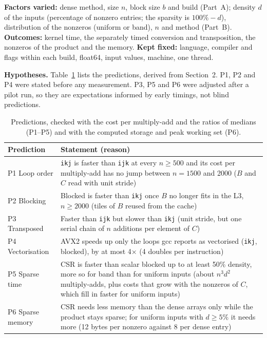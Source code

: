 \documentclass[11pt,a4paper]{article}
\begin{document}
\textbf{Factors varied:} dense method, size $n$, block size $b$ and build (Part~A); density
$d$ of the inputs (percentage of nonzero entries; the sparsity is $100\% - d$), distribution
of the nonzeros (uniform or band), $n$ and method (Part~B). \textbf{Outcomes:} kernel time,
the separately timed conversion and transposition, the nonzeros of the product and the
memory. \textbf{Kept fixed:} language, compiler and flags within each build, float64, input
values, machine, one thread.

\needspace{0.35\textheight}
\textbf{Hypotheses.} Table~\ref{tab:predictions} lists the predictions, derived from
Section~2. P1, P2 and P4 were stated before any measurement. P3, P5 and P6 were adjusted
after a pilot run, so they are expectations informed by early timings, not blind
predictions.

\begin{table}[H]
\centering
\small
\setlength{\tabcolsep}{4pt}
\begin{tabular}{>{\raggedright\arraybackslash}p{2.7cm}p{12.5cm}}
\toprule
\textbf{Prediction} & \textbf{Statement (reason)} \\
\midrule
P1 Loop order & \texttt{ikj} is faster than \texttt{ijk} at every $n \ge 500$ and its cost
per multiply-add has no jump between $n = 1500$ and 2000 ($B$ and $C$ read with unit
stride) \\
P2 Blocking & Blocked is faster than \texttt{ikj} once $B$ no longer fits in the L3,
$n \ge 2000$ (tiles of $B$ reused from the cache) \\
P3 Transposed & Faster than \texttt{ijk} but slower than \texttt{ikj} (unit stride, but one
serial chain of $n$ additions per element of $C$) \\
P4 Vectorisation & AVX2 speeds up only the loops gcc reports as vectorised (\texttt{ikj},
blocked), by at most 4$\times$ (4 doubles per instruction) \\
P5 Sparse time & CSR is faster than scalar blocked up to at least 50\% density, more so
for band than for uniform inputs (about $n^3 d^2$ multiply-adds, plus costs that grow with
the nonzeros of $C$, which fill in faster for uniform inputs) \\
P6 Sparse memory & CSR needs less memory than the dense arrays only while the product stays
sparse; for uniform inputs with $d \ge 5\%$ it needs more (12 bytes per nonzero against 8
per dense entry) \\
\bottomrule
\end{tabular}
\caption{Predictions, checked with the cost per multiply-add and the ratios of medians
(P1--P5) and with the computed storage and peak working set (P6).}
\label{tab:predictions}
\end{table}
\end{document}
